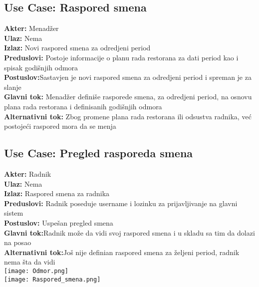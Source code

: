 \documentclass{article}
\begin{document}
\subsection{\textbf{Use Case}: Raspored smena}
\textbf{Akter:} Menadžer\\
\textbf{Ulaz:} Nema\\
\textbf{Izlaz:} Novi raspored smena za odredjeni period\\
\textbf{Preduslovi:} Postoje informacije o planu rada restorana za dati period kao i spisak godišnjih odmora\\
\textbf{Postuslov:}Sastavjen je novi raspored smena za odredjeni period i spreman je za slanje\\
\textbf{Glavni tok:} Menadžer definiše rasporede smena, za odredjeni period, na osnovu plana rada restorana i definisanih godišnjih odmora\\
\textbf{Alternativni tok:} Zbog promene plana rada restorana ili odsustva radnika, već postojeći raspored mora da se menja\\

\subsection{\textbf{Use Case}: Pregled rasporeda smena}
\textbf{Akter:} Radnik\\
\textbf{Ulaz:} Nema\\
\textbf{Izlaz:} Raspored smena za radnika\\
\textbf{Preduslovi:} Radnik poseduje username i lozinku za prijavljivanje na glavni sistem\\
\textbf{Postuslov:} Uspešan pregled smena\\
\textbf{Glavni tok:}Radnik može da vidi svoj raspored smena i u skladu sa tim da dolazi na posao\\
\textbf{Alternativni tok:}Još nije definian raspored smena za željeni period, radnik nema šta da vidi\\
\texttt{[image: Odmor.png]}\\
\texttt{[image: Raspored\_smena.png]}\\
\end{document}
